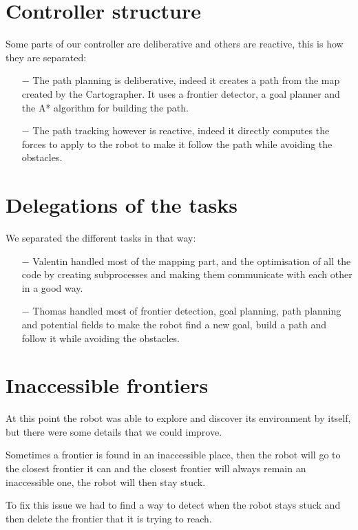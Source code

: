 \section{Controller structure}

Some parts of our controller are deliberative and others are reactive, this is how they are separated:

\begin{itemize}
    \item[$-$] The path planning is deliberative, indeed it creates a path from the map created by the Cartographer.
        It uses a frontier detector, a goal planner and the A* algorithm for building the path.
    \item[$-$] The path tracking however is reactive, indeed it directly computes the forces to apply to the robot to make it follow the path while avoiding the obstacles.
\end{itemize}

\section{Delegations of the tasks}

We separated the different tasks in that way:

\begin{itemize}
    \item[$-$] Valentin handled most of the mapping part, and the optimisation of all the code by creating subprocesses and making them communicate with each other in a good way.
    \item[$-$] Thomas handled most of frontier detection, goal planning, path planning and potential fields to make the robot find a new goal, build a path and follow it while avoiding the obstacles.
\end{itemize}

\section{Inaccessible frontiers}

At this point the robot was able to explore and discover its environment by itself, but there were some details that we could improve.

Sometimes a frontier is found in an inaccessible place, then the robot will go to the closest frontier it can and the closest frontier will always remain an inaccessible one, the robot will then stay stuck.

To fix this issue we had to find a way to detect when the robot stays stuck and then delete the frontier that it is trying to reach.

